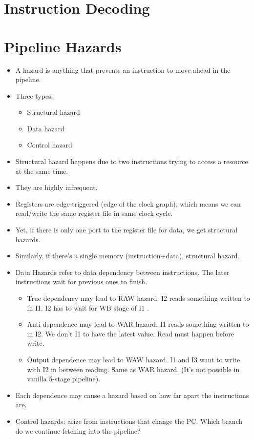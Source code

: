 \documentclass{report}
\begin{document}
\section{Instruction Decoding}
\section{Pipeline Hazards}
\begin{itemize}
\item A hazard is anything that prevents an instruction to move ahead in the pipeline.
\item Three types:
\begin{itemize}
\item Structural hazard
\item Data hazard
\item Control hazard
\end{itemize}
\item Structural hazard happens due to two instructions trying to access a resource at the same time.
\item They are highly infrequent.
\item Registers are edge-triggered (edge of the clock graph), which means we can read/write the same register file in same clock cycle. 
\item Yet, if there is only one port to the register file for data, we get structural hazards.
\item Similarly, if there's a single memory (instruction+data), structural hazard.
\item Data Hazards refer to data dependency between instructions. The later instructions wait for previous ones to finish.
\begin{itemize}
\item True dependency may lead to RAW hazard. I2 reads something written to in I1. I2 has to wait for WB stage of I1 .
\item Anti dependence may lead to WAR hazard. I1 reads something written to in I2. We don't I1 to have the latest value. Read must happen before write.
\item Output dependence may lead to WAW hazard. I1 and I3 want to write with I2 in between reading. Same as WAR hazard. (It's not possible in vanilla 5-stage pipeline).
\end{itemize}
\item Each dependence may cause a hazard based on how far apart the instructions are.
\item Control hazards: arize from instructions that change the PC. Which branch do we continue fetching into the pipeline?

\end{itemize}
\end{document}

